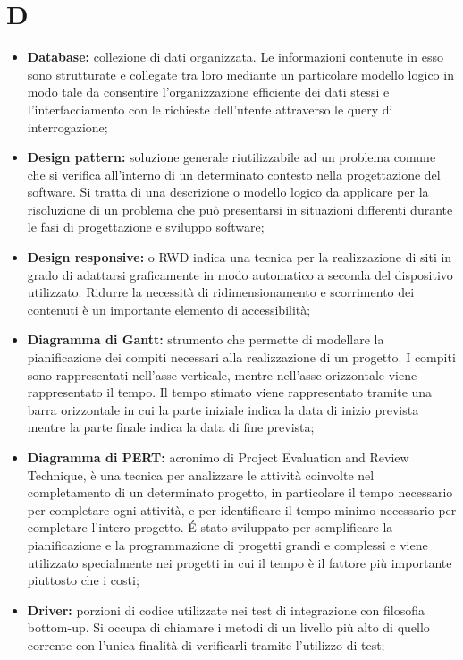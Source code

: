 \section*{\Huge D} %
\label{sec:d}
	\begin{itemize}
		\item \textbf{Database:} collezione di dati organizzata. Le informazioni contenute in esso sono strutturate e collegate tra loro mediante un particolare modello logico in modo tale da consentire l'organizzazione efficiente dei dati stessi e l'interfacciamento con le richieste dell'utente attraverso le query di interrogazione;
		\item \textbf{Design pattern:} soluzione generale riutilizzabile ad un problema comune che si verifica all'interno di un determinato contesto nella progettazione del software. Si tratta di una descrizione o modello logico da applicare per la risoluzione di un problema che può presentarsi in situazioni differenti durante le fasi di progettazione e sviluppo software;
		\item \textbf{Design responsive:} o RWD indica una tecnica per la realizzazione di siti in grado di adattarsi graficamente in modo automatico a seconda del dispositivo utilizzato. Ridurre la necessità di ridimensionamento e scorrimento dei contenuti è un importante elemento di accessibilità;
		\item \textbf{Diagramma di Gantt:} strumento che permette di modellare la pianificazione dei compiti necessari alla realizzazione di un progetto. I compiti sono rappresentati nell'asse verticale, mentre nell'asse orizzontale viene rappresentato il tempo. Il tempo stimato viene rappresentato tramite una barra orizzontale in cui la parte iniziale indica la data di inizio prevista mentre la parte finale indica la data di fine prevista;
		\item \textbf{Diagramma di PERT:} acronimo di Project Evaluation and Review Technique, è una tecnica per analizzare le attività coinvolte nel completamento di un determinato progetto, in particolare il tempo necessario per completare ogni attività, e per identificare il tempo minimo necessario per completare l'intero progetto. É stato sviluppato per semplificare la pianificazione e la programmazione di progetti grandi e complessi e viene utilizzato specialmente nei progetti in cui il tempo è il fattore più importante piuttosto che i costi;
		\item \textbf{Driver:} porzioni di codice utilizzate nei test di integrazione con filosofia bottom-up. Si occupa di chiamare i metodi di un livello più alto di quello corrente con l'unica finalità di verificarli tramite l'utilizzo di test;
	\end{itemize}
\pagebreak


